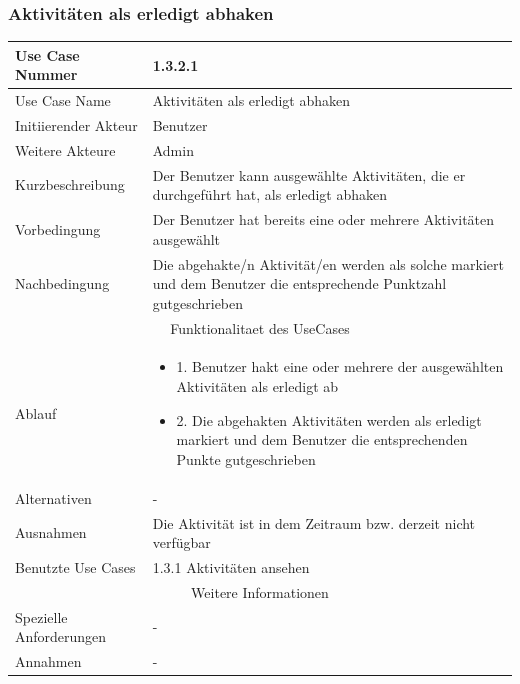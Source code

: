 \documentclass[10pt,a4paper]{article}
\begin{document}
	\subsubsection{Aktivit\"aten als erledigt abhaken}
	\begin{tabular}{|l|p{.5\linewidth}|}
	\hline Use Case Nummer & 1.3.2.1 \\ 
	\hline Use Case Name & Aktivit\"aten als erledigt abhaken \\ 
	\hline Initiierender Akteur & Benutzer \\
	\hline Weitere Akteure & Admin \\
	\hline Kurzbeschreibung & Der Benutzer kann ausgew\"ahlte Aktivit\"aten, die er durchgef\"uhrt hat, als erledigt abhaken \\
	\hline Vorbedingung & Der Benutzer hat bereits eine oder mehrere Aktivit\"aten ausgew\"ahlt \\
	\hline Nachbedingung & Die abgehakte/n Aktivit\"at/en werden als solche markiert und dem Benutzer die entsprechende Punktzahl gutgeschrieben \\
	\hline \multicolumn{2}{|c|}{Funktionalitaet des UseCases}\\
	\hline Ablauf & \begin{itemize}
			\item 1. Benutzer hakt eine oder mehrere der ausgew\"ahlten Aktivit\"aten als erledigt ab
			\item 2. Die abgehakten Aktivit\"aten werden als erledigt markiert und dem Benutzer die entsprechenden Punkte gutgeschrieben
		\end{itemize} \\
	\hline Alternativen & - \\
	\hline Ausnahmen & Die Aktivit\"at ist in dem Zeitraum bzw. derzeit nicht verf\"ugbar \\
	\hline Benutzte Use Cases & 1.3.1 Aktivit\"aten ansehen \\
	\hline \multicolumn{2}{|c|}{Weitere Informationen} \\
	\hline Spezielle Anforderungen & - \\
	\hline Annahmen & - \\
	\hline
	\end{tabular} 
\end{document}
